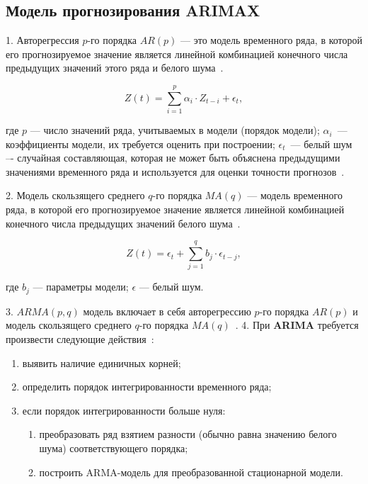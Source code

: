 \subsection{Модель прогнозирования ARIMAX}

1. Авторегрессия $p$-го порядка $AR(p)$ --- это модель временного ряда, в которой его прогнозируемое значение является
линейной комбинацией конечного числа предыдущих значений этого ряда и белого шума~\cite{myref9,poliref8}.

\begin{equation}
    \label{a1}
    Z(t) = \sum_{i=1} ^{p} \alpha_i \cdot Z_{t-i}+\epsilon_t,
\end{equation}

где $p$ --- число значений ряда, учитываемых в модели (порядок модели);
$\alpha_i$~--- коэффициенты модели, их требуется оценить при построении;
$\epsilon_t$~--- белый шум –- случайная составляющая, которая не может быть объяснена предыдущими значениями временного
ряда и используется для оценки точности прогнозов~\cite{poliref8}.

2. Модель скользящего среднего $q$-го порядка $MA(q)$ — модель временного ряда, в которой его прогнозируемое значение
является линейной комбинацией конечного числа предыдущих значений белого шума~\cite{poliref3, poliref8}.

\begin{equation}
    Z(t) = \epsilon_t+\sum_{j=1} ^{q} b_j \cdot \epsilon_{t-j},
\end{equation}

где $b_j$ ---  параметры модели;
$\epsilon$ --- белый шум.

3. $ARMA(p, q)$ модель включает в себя авторегрессию $p$-го порядка $AR(p)$ и модель скользящего среднего $q$-го порядка $MA(q)$~\cite{myref9, poliref8}.
4. При \textbf{ARIMA} требуется произвести следующие действия~\cite{myref9}:
\begin{enumerate}
    \item выявить наличие единичных корней;
    \item определить порядок интегрированности временного ряда;
    \item если порядок интегрированности больше нуля:
    \begin{enumerate}
        \item[3.1)] преобразовать ряд взятием разности (обычно равна значению белого шума) соответствующего порядка;
        \item[3.2)] построить ARMA-модель для преобразованной стационарной модели.
    \end{enumerate}
\end{enumerate}

